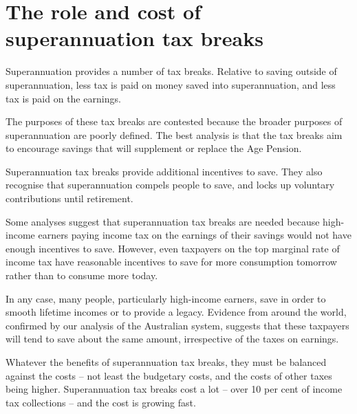 %
%
%
\chapter{The role and cost of superannuation tax breaks}
Superannuation provides a number of tax breaks. Relative to saving outside of superannuation, less tax is paid on money saved into superannuation, and less tax is paid on the earnings.

The purposes of these tax breaks are contested because the broader purposes of superannuation are poorly defined. The best analysis is that the tax breaks aim to encourage savings that will supplement or replace the Age Pension. 

Superannuation tax breaks provide additional incentives to save. They also recognise that superannuation compels people to save, and locks up voluntary contributions until retirement.

Some analyses suggest that superannuation tax breaks are needed because high-income earners paying income tax on the earnings of their savings would not have enough incentives to save. However, even taxpayers on the top marginal rate of income tax have reasonable incentives to save for more consumption tomorrow rather than to consume more  today.

In any case, many people, particularly high-income earners, save in order to smooth lifetime incomes or to provide a legacy. Evidence from around the world, confirmed by our analysis of the Australian system, suggests that these taxpayers will tend to save about the same amount, irrespective of the taxes on earnings.

\oneraggedpage

Whatever the benefits of superannuation tax breaks, they must be balanced against the costs – not least the budgetary costs, and the costs of other taxes being higher. Superannuation tax breaks cost a lot – over 10 per cent of income tax collections – and the cost is growing fast.

